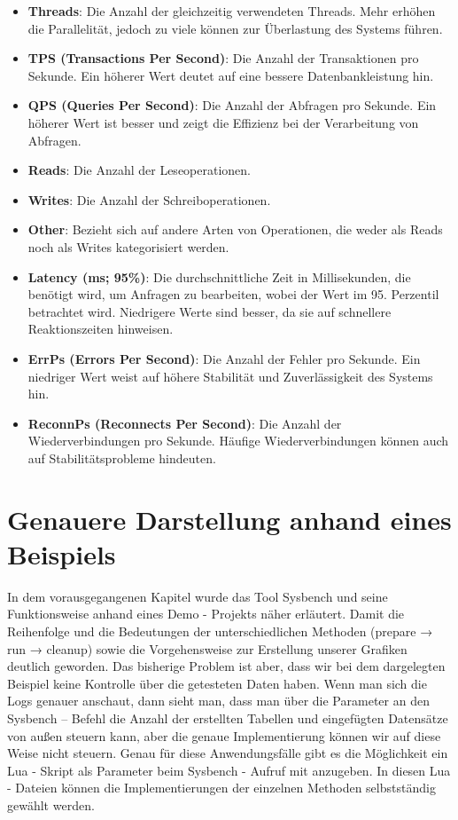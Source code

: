 \begin{itemize}
    \item \textbf{Threads}: Die Anzahl der gleichzeitig verwendeten Threads.
    Mehr erhöhen die Parallelität, jedoch zu viele können zur Überlastung des Systems führen.
    \item \textbf{TPS (Transactions Per Second)}: Die Anzahl der Transaktionen pro Sekunde.
    Ein höherer Wert deutet auf eine bessere Datenbankleistung hin.
    \item \textbf{QPS (Queries Per Second)}: Die Anzahl der Abfragen pro Sekunde.
    Ein höherer Wert ist besser und zeigt die Effizienz bei der Verarbeitung von Abfragen.
    \item \textbf{Reads}: Die Anzahl der Leseoperationen.
    \item \textbf{Writes}: Die Anzahl der Schreiboperationen.
    \item \textbf{Other}: Bezieht sich auf andere Arten von Operationen, die weder als Reads noch als Writes kategorisiert werden.
    \item \textbf{Latency (ms; 95\%)}: Die durchschnittliche Zeit in Millisekunden, die benötigt wird, um Anfragen zu bearbeiten, wobei der Wert im 95. Perzentil betrachtet wird.
    Niedrigere Werte sind besser, da sie auf schnellere Reaktionszeiten hinweisen.
    \item \textbf{ErrPs (Errors Per Second)}: Die Anzahl der Fehler pro Sekunde.
    Ein niedriger Wert weist auf höhere Stabilität und Zuverlässigkeit des Systems hin.
    \item \textbf{ReconnPs (Reconnects Per Second)}: Die Anzahl der Wiederverbindungen pro Sekunde.
    Häufige Wiederverbindungen können auch auf Stabilitätsprobleme hindeuten.
\end{itemize}

\section{Genauere Darstellung anhand eines Beispiels}\label{sec:genauere-darstellung-anhand-eines-beispiels}
In dem vorausgegangenen Kapitel  wurde das Tool Sysbench und seine Funktionsweise anhand eines Demo - Projekts näher erläutert.
Damit die Reihenfolge und die Bedeutungen der unterschiedlichen Methoden (prepare → run → cleanup) sowie die Vorgehensweise zur Erstellung unserer Grafiken deutlich geworden.
Das bisherige Problem ist aber, dass wir bei dem dargelegten Beispiel keine Kontrolle über die getesteten Daten haben.
Wenn man sich die Logs genauer anschaut, dann sieht man, dass man über die Parameter an den Sysbench – Befehl die Anzahl der erstellten Tabellen und eingefügten Datensätze von außen steuern kann, aber die genaue Implementierung können wir auf diese Weise nicht steuern.
Genau für diese Anwendungsfälle gibt es die Möglichkeit ein Lua - Skript als Parameter beim Sysbench - Aufruf mit anzugeben.
In diesen Lua - Dateien können die Implementierungen der einzelnen Methoden selbstständig gewählt werden.

